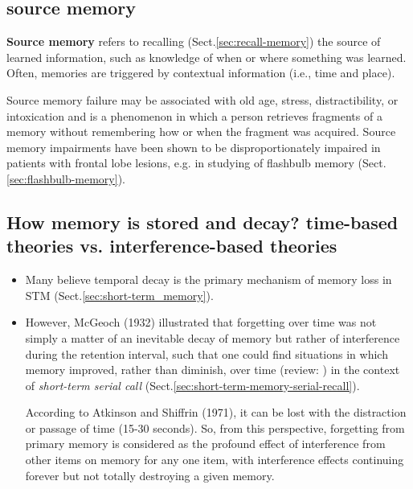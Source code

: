 \subsection{source memory}
\label{sec:source-memory}

{\bf Source memory} refers to recalling (Sect.\ref{sec:recall-memory}) the
source of learned information, such as knowledge of when or where something was
learned. Often, memories are triggered by contextual information (i.e., time and
place).

Source memory failure may be associated with old age, stress, distractibility,
or intoxication and is a phenomenon in which a person retrieves fragments of a
memory without remembering how or when the fragment was acquired. Source memory
impairments have been shown to be disproportionately impaired in patients with
frontal lobe lesions, e.g. in studying of flashbulb memory
(Sect.\ref{sec:flashbulb-memory}).





\subsection{How memory is stored and decay? time-based theories vs.
interference-based theories}

\begin{itemize}

  \item Many believe temporal decay is the primary mechanism of memory loss in
  STM (Sect.\ref{sec:short-term_memory}).
  
  \item However, McGeoch (1932) illustrated that forgetting over time was not
  simply a matter of an inevitable decay of memory but rather of interference
  during the retention interval, such that  one could find situations in which
  memory improved, rather than diminish, over time (review:
  \citep{lewandowsky2004}) in the context of {\it short-term serial call}
  (Sect.\ref{sec:short-term-memory-serial-recall}).

  According to Atkinson and Shiffrin (1971), it  can be lost with the
  distraction or passage of time (15-30 seconds). So, from this perspective,
  forgetting from primary memory is considered as the profound effect of
  interference from other items on memory for any one item,
with interference effects continuing forever but not totally destroying a given
memory.
   
\end{itemize}   

